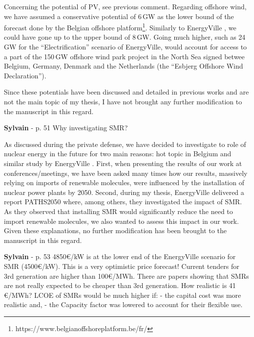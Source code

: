 \documentclass[12pt,a4paper]{article}
\begin{document}
\noindent Concerning the potential of PV, see previous comment. Regarding offshore wind, we have assumed a conservative potential of 6\,GW as the lower bound of the forecast done by the Belgian offshore platform\footnote{https://www.belgianoffshoreplatform.be/fr/}. Similarly to EnergyVille \cite{PATHS2050}, we could have gone up to the upper bound of 8\,GW. Going much higher, such as 24\,GW for the ``Electrification'' scenario of EnergyVille, would account for access to a part of the 150\,GW offshore wind park project in the North Sea signed betwee Belgium, Germany, Denmark and the Netherlands (the ``Esbjerg Offshore Wind Declaration''). 

\noindent Since these potentials have been discussed and detailed in previous works and are not the main topic of my thesis, I have not brought any further modification to the manuscript in this regard.

\begin{mdframed}[style=comment] %
{\color{purple} \textbf{Sylvain}} - p. 51 Why investigating SMR?
\end{mdframed}

\noindent As discussed during the private defense, we have decided to investigate to role of nuclear energy in the future for two main reasons: hot topic in Belgium and similar study by EnergyVille \cite{PATHS2050}. First, when presenting the results of our work at conferences/meetings, we have been asked many times how our results, massively relying on imports of renewable molecules, were influenced by the installation of nuclear power plants by 2050. Second, during my thesis, EnergyVille delivered a report PATHS2050 where, among others, they investigated the impact of SMR. As they observed that installing SMR would significantly reduce the need to import renewable molecules, we also wanted to assess this impact in our work. Given these explanations, no further modification has been brought to the manuscript in this regard.

\begin{mdframed}[style=comment] %
{\color{purple} \textbf{Sylvain}} - p. 53 4850€/kW is at the lower end of the EnergyVille scenario for SMR (4500€/kW). This is a very optimistic price forecast! Current tenders for 3rd generation are higher than 100€/MWh. There are papers showing that SMRs are not really expected to be cheaper than 3rd generation. How realistic is 41 €/MWh? LCOE of SMRs would be much higher if: - the capital cost was more realistic and, - the Capacity factor was lowered to account for their flexible use.
\end{mdframed}
\end{document}
